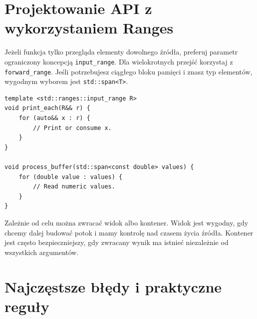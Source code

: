 \section{Projektowanie API z wykorzystaniem Ranges}
\label{sec:cpp8-api}

Jeżeli funkcja tylko przegląda elementy dowolnego źródła, preferuj
parametr ograniczony koncepcją \texttt{input\_range}. Dla wielokrotnych
przejść korzystaj z \texttt{forward\_range}. Jeśli potrzebujesz
ciągłego bloku pamięci i znasz typ elementów, wygodnym wyborem jest
\texttt{std::span<T>}.

\begin{lstlisting}
template <std::ranges::input_range R>
void print_each(R&& r) {
    for (auto&& x : r) {
        // Print or consume x.
    }
}

void process_buffer(std::span<const double> values) {
    for (double value : values) {
        // Read numeric values.
    }
}
\end{lstlisting}

Zależnie od celu można zwracać widok albo kontener. Widok jest
wygodny, gdy chcemy dalej budować potok i mamy kontrolę nad czasem
życia źródła. Kontener jest często bezpieczniejszy, gdy zwracany
wynik ma istnieć niezależnie od wszystkich argumentów.

\section{Najczęstsze błędy i praktyczne reguły}
\label{sec:cpp8-pitfalls}

